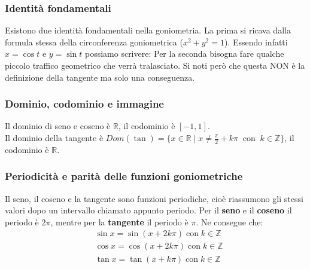 
\subsubsection{Identità fondamentali}
Esistono due identità fondamentali nella goniometria. La prima si ricava dalla 
formula stessa della circonferenza goniometrica ($x^2+y^2=1$). Essendo infatti 
$x = \cos{t}$ e $y = \sin{t}$ possiamo scrivere:
Per la seconda bisogna fare qualche piccolo traffico geometrico che verrà 
tralasciato. Si noti però che questa NON è la definizione della tangente ma 
solo una conseguenza.

\subsubsection{Dominio, codominio e immagine}
Il dominio di seno e coseno è $\mathbb{R}$, il codominio è $[-1, 1]$.\\
Il dominio della tangente è $Dom(\tan) = \{x \in \mathbb{R}\; |\; x \neq 
\frac{\pi}{2} + k\pi\;\; \mathrm{con}\;\; k \in \mathbb{Z}\}$, il codominio è 
$\mathbb{R}$.

\subsubsection{Periodicità e parità delle funzioni goniometriche}

Il seno, il coseno e la tangente sono funzioni periodiche, cioè riassumono gli 
stessi valori dopo un intervallo chiamato appunto periodo. Per il \textbf{seno} 
e il \textbf{coseno} il periodo è $2\pi$, mentre per la \textbf{tangente} il 
periodo è $\pi$. Ne consegue che:
\begin{align*}
    &\sin{x} = \sin{(x + 2k\pi)}\; \mathrm{con}\; k\in \mathbb{Z}\\
    &\cos{x} = \cos{(x + 2k\pi)}\; \mathrm{con}\; k\in \mathbb{Z}\\
    &\tan{x} = \tan{(x + k\pi)}\; \mathrm{con}\; k\in \mathbb{Z}\\
\end{align*}

